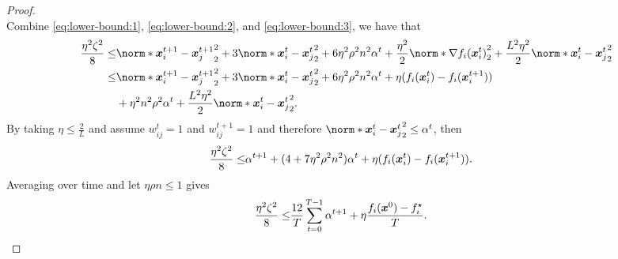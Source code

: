 \documentclass{article}
\begin{document}
\begin{proof}
\begin{equation}
  \end{equation}
  Combine \eqref{eq:lower-bound:1}, \eqref{eq:lower-bound:2}, and \eqref{eq:lower-bound:3}, we have that
  \begin{align*}
    \frac{\eta^2\zeta^2}{8}
    \le& 
    \norm*{\xx_i^{t+1} - \xx_j^{t+1}}_2^2 
    + 3\norm*{\xx_i^t - \xx_j^t}_2^2
    + 6\eta^2\rho^2n^2\alpha^t
    + \frac{\eta^2}{2} \norm*{\nabla f_i(\xx^t_i)}_2^2
    + \frac{L^2\eta^2}{2}\norm*{\xx^t_i - \xx^t_j}_2^2 \\
    \le& 
    \norm*{\xx_i^{t+1} - \xx_j^{t+1}}_2^2 
    + 3\norm*{\xx_i^t - \xx_j^t}_2^2
    + 6\eta^2\rho^2n^2\alpha^t
    + \eta (f_i(\xx_i^t) - f_i(\xx_i^{t+1})) \\
    &+ \eta^2n^2\rho^2\alpha^t
    + \frac{L^2\eta^2}{2}\norm*{\xx^t_i - \xx^t_j}_2^2.
  \end{align*}
  By taking $\eta\le\frac{2}{L}$ and assume $w_{ij}^t=1$ and $w_{ij}^{t+1}=1$ and therefore
  $\norm*{\xx_i^t - \xx_j^t}_2^2\le\alpha^t$, then
  \begin{align*}
    \frac{\eta^2\zeta^2}{8}\le& 
    \alpha^{t+1} 
    + (4+7\eta^2\rho^2n^2)\alpha^t
    + \eta (f_i(\bm{x}_i^t) - f_i(\bm{x}_i^{t+1})).
  \end{align*}
  Averaging over time and let $\eta\rho n\le 1$ gives
  \begin{align*}
    \frac{\eta^2\zeta^2}{8}\le& 
    \frac{12}{T}\sum_{t=0}^{T-1}\alpha^{t+1} 
    + \eta \frac{f_i(\bm{x}^0) - f_i^\star}{T}.
  \end{align*}
\end{proof}
\end{document}
